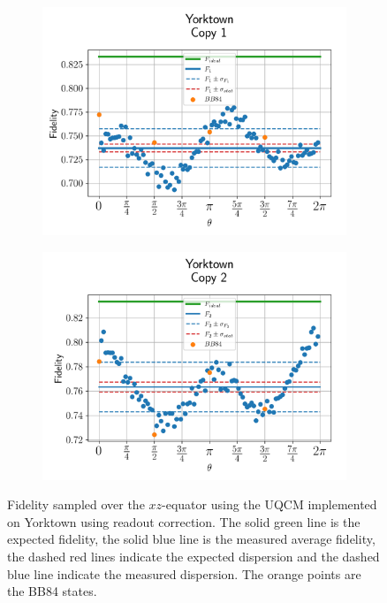 \begin{figure}[H]
    \centering
    \begin{subfigure}{.45\textwidth}
      \centering
      \includegraphics[width=\textwidth]{Figures/UQCM/IBM/OnlyEquator/results_corrected_ibmqx2_copy1.png}
    \end{subfigure}%
    \begin{subfigure}{.45\textwidth}
      \centering
      \includegraphics[width=\textwidth]{Figures/UQCM/IBM/OnlyEquator/results_corrected_ibmqx2_copy2.png}
    \end{subfigure}
    \caption{Fidelity sampled over the $xz$-equator using the UQCM implemented on Yorktown using readout correction. The solid green line is the expected fidelity, the solid blue line is the measured average fidelity, the dashed red lines indicate the expected dispersion and the dashed blue line indicate the measured dispersion. The orange points are the BB84 states.}
    \label{fig:uqcm_eq_york}
\end{figure}

